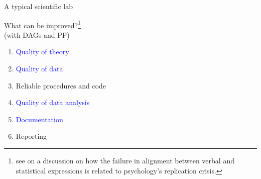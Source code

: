 %
%
\begin{lhframe}[rhgraphic={\texttt{[image: car\_salesman.jpg]}}]
	{A typical scientific lab}
	
	What can be improved?\footnote{see \citet{Yarkoni_2020} on a discussion on how the failure in alignment between verbal and statistical expressions is related to psychology's replication crisis.}\\
	{\small (with DAGs and PP)}
	\begin{enumerate}
		\item \textcolor{blue}{Quality of theory}
		\item \textcolor{blue}{Quality of data}
		\item \alert{Reliable procedures and code}
		\item \textcolor{blue}{Quality of data analysis}
		\item \textcolor{blue}{Documentation}
		\item Reporting
	\end{enumerate}
\end{lhframe}
%
%
